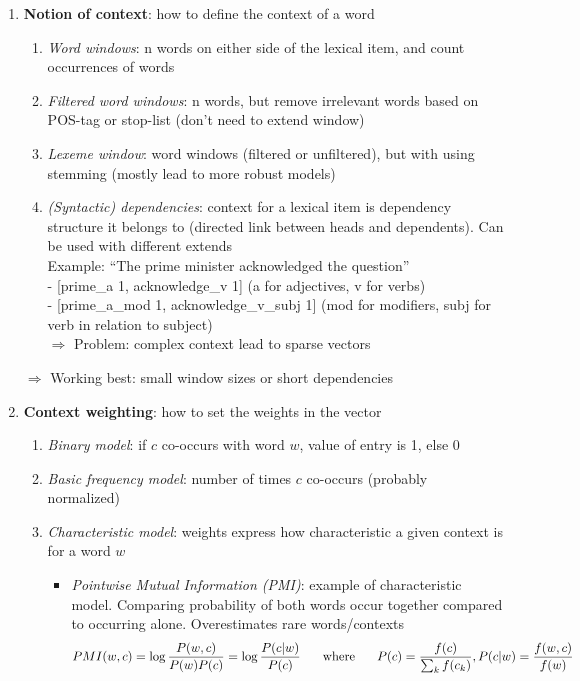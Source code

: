 \begin{enumerate}
	\item \textbf{Notion of context}: how to define the context of a word
	\begin{enumerate}
		\item \textit{Word windows}: n words on either side of the lexical item, and count occurrences of words
		\item \textit{Filtered word windows}: n words, but remove irrelevant words based on POS-tag or stop-list (don't need to extend window)
		\item \textit{Lexeme window}: word windows (filtered or unfiltered), but with using stemming (mostly lead to more robust models)
		\item \textit{(Syntactic) dependencies}: context for a lexical item is dependency structure it belongs to (directed link between heads and dependents). Can be used with different extends\\
		Example: ``The prime minister acknowledged the question'' \\
		- [prime\_a 1, acknowledge\_v 1] (a for adjectives, v for verbs)\\
		- [prime\_a\_mod 1, acknowledge\_v\_subj 1] (mod for modifiers, subj for verb in relation to subject)\\
		$\Rightarrow$ Problem: complex context lead to sparse vectors
	\end{enumerate}
	$\Rightarrow$ Working best: small window sizes or short dependencies
	\item \textbf{Context weighting}: how to set the weights in the vector
	\begin{enumerate}
		\item \textit{Binary model}: if $c$ co-occurs with word $w$, value of entry is 1, else 0
		\item \textit{Basic frequency model}: number of times $c$ co-occurs (probably normalized)
		\item \textit{Characteristic model}: weights express how characteristic a given context is for a word $w$\\
		\begin{itemize}
			\item \textit{Pointwise Mutual Information (PMI)}: example of characteristic model. Comparing probability of both words occur together compared to occurring alone. Overestimates rare words/contexts\\
			$$PMI(w,c)=\log \frac{P(w,c)}{P(w)P(c)} = \log \frac{P(c|w)}{P(c)} \text{\hspace{5mm} where \hspace{5mm}}P(c) = \frac{f(c)}{\sum_k f(c_k)}, P(c|w) = \frac{f(w,c)}{f(w)}$$

\end{itemize}
\end{enumerate}
\end{enumerate}
